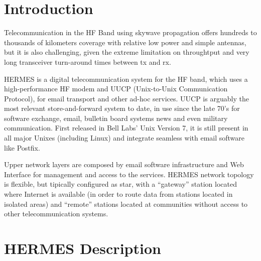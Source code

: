 
\section{Introduction}

  Telecommunication in the HF Band using skywave propagation offers hundreds to thousands
  of kilometers coverage with relative low power and simple antennas, but it is also challenging,
  given the extreme limitation on throughtput  and very long transceiver turn-around times between tx and rx.

  HERMES is a digital telecommunication system for the HF band, which uses a high-performance HF modem and UUCP
  (Unix-to-Unix Communication Protocol), for email transport and other ad-hoc services.
  UUCP is arguably the most relevant store-and-forward system to date, in use since the late 70's
  for software exchange, email, bulletin board systems  news and even military communication. First released
  in Bell Labs' Unix Version 7, it is still present in all major Unixes (including Linux) and integrate seamless
  with email software like Postfix.

  Upper network layers are composed by email software infrastructure and Web Interface for management and access to the services.
  HERMES network topology is flexible, but tipically configured as star, with a ``gateway'' station located where Internet is available
  (in order to route data from stations located in isolated areas) and ``remote'' stations located at communities without access to
  other telecommunication systems.


\section{HERMES Description}

